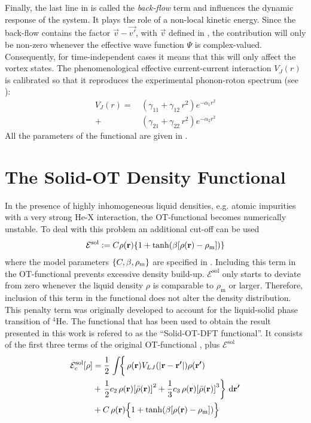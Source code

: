		Finally, the last line in  is called the \emph{back-flow} term and influences the dynamic response of the system. It plays the role of a non-local kinetic energy. Since the back-flow contains the factor $\vec{v}-\vec{v'}$, with $\vec{v}$ defined in , the contribution will only be non-zero whenever the effective wave function $\Psi$ is complex-valued. Consequently, for time-independent cases it means that this will only affect the vortex states. The phenomenological effective current-current interaction $V_J(r)$ is calibrated so that it reproduces the experimental phonon-roton spectrum (see ):
		\begin{align}
			V_J(r) =\,&(\gamma_{11} +\gamma_{12} \, r^2) e^{-\alpha_1 r^2} \nonumber \\
				+\,&(\gamma_{21} +\gamma_{22} \, r^2) e^{-\alpha_2 r^2}
		\end{align}
		All the parameters of the functional are given in .

		\section{The Solid-OT Density Functional}\label{sec:solid}
			In the presence of highly inhomogeneous liquid densities, e.g. atomic impurities with a very strong He-X interaction, the OT-functional  becomes numerically unstable. To deal with this problem an additional cut-off can be used
			\begin{align}
				\mathcal{E}^\mathrm{sol} \vcentcolon= C\rho(\bm{\mathrm{r}})\qty{1+\tanh(\beta\qty[\rho(\bm{\mathrm{r}})-\rho_\mathrm{m}])}
			\end{align}
			where the model parameters $\qty{C,\beta,\rho_\mathrm{m}}$ are specified in . Including this term in the OT-functional prevents excessive density build-up. $\mathcal{E}^\mathrm{sol}$ only starts to deviate from zero whenever the liquid density $\rho$ is comparable to $\rho_\mathrm{m}$ or larger. Therefore, inclusion of this term in the functional does not alter the density distribution. This penalty term was originally developed to account for the liquid-solid phase transition of $^4$He\citep{Anc05a,Cau07}. The functional that has been used to obtain the result presented in this work is refered to as the ``Solid-OT-DFT functional''. It consists of the first three terms of the original OT-functional , plus $\mathcal{E}^\mathrm{sol}$
			\begin{align}
				\mathcal{E}_c^\mathrm{sol}[\rho] &=  
				\frac{1}{2} \left.\int \! \right\{\rho(\bm{\mathrm{r}}) V_{LJ}(\abs{\bm{\mathrm{r}}-\bm{\mathrm{r'}}}) \rho(\bm{\mathrm{r'}}) \nonumber \\
				&+ \left.\frac{1}{2} c_2\, \rho(\bm{\mathrm{r}}) \qty[\bar\rho(\bm{\mathrm{r}})]^2 
				+ \frac{1}{3} c_3 \, \rho(\bm{\mathrm{r}}) \qty[\bar\rho(\bm{\mathrm{r}})]^3\right\}\,\mathrm{d}{\bm{\mathrm{r'}}} \nonumber \\
				&+ C\,\rho(\bm{\mathrm{r}})\qty\Big{1+\tanh(\beta\qty[\rho(\bm{\mathrm{r}})-\rho_\mathrm{m}])} \label{eq:solid-otf}
			\end{align}

